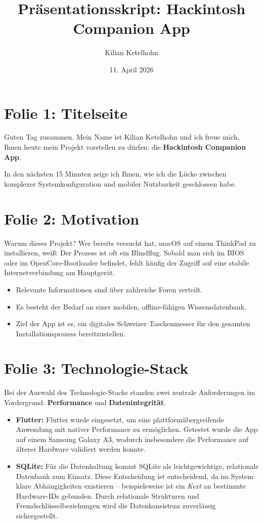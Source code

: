 \documentclass[12pt]{article}
\title{Präsentationsskript: Hackintosh Companion App}
\author{Kilian Ketelhohn}
\date{11. April 2026}
\begin{document}
\maketitle

\section*{Folie 1: Titelseite}
Guten Tag zusammen. Mein Name ist Kilian Ketelhohn und ich freue mich, Ihnen heute mein Projekt vorstellen zu dürfen: die \textbf{Hackintosh Companion App}. 

In den nächsten 15 Minuten zeige ich Ihnen, wie ich die Lücke zwischen komplexer Systemkonfiguration und mobiler Nutzbarkeit geschlossen habe.

\section*{Folie 2: Motivation}
Warum dieses Projekt? Wer bereits versucht hat, macOS auf einem ThinkPad zu installieren, weiß: Der Prozess ist oft ein Blindflug. Sobald man sich im BIOS oder im OpenCore-Bootloader befindet, fehlt häufig der Zugriff auf eine stabile Internetverbindung am Hauptgerät.

\begin{itemize}
    \item Relevante Informationen sind über zahlreiche Foren verteilt.
    \item Es besteht der Bedarf an einer mobilen, offline-fähigen Wissensdatenbank.
    \item Ziel der App ist es, ein digitales Schweizer Taschenmesser für den gesamten Installationsprozess bereitzustellen.
\end{itemize}

\section*{Folie 3: Technologie-Stack}
Bei der Auswahl des Technologie-Stacks standen zwei zentrale Anforderungen im Vordergrund: \textbf{Performance} und \textbf{Datenintegrität}.

\begin{itemize}
    \item \textbf{Flutter:} Flutter wurde eingesetzt, um eine plattformübergreifende Anwendung mit nativer Performance zu ermöglichen. Getestet wurde die App auf einem Samsung Galaxy A3, wodurch insbesondere die Performance auf älterer Hardware validiert werden konnte.

    \item \textbf{SQLite:} Für die Datenhaltung kommt SQLite als leichtgewichtige, relationale Datenbank zum Einsatz. Diese Entscheidung ist entscheidend, da im System klare Abhängigkeiten existieren – beispielsweise ist ein \textit{Kext} an bestimmte Hardware-IDs gebunden. Durch relationale Strukturen und Fremdschlüsselbeziehungen wird die Datenkonsistenz zuverlässig sichergestellt.
\end{itemize}
\end{document}
